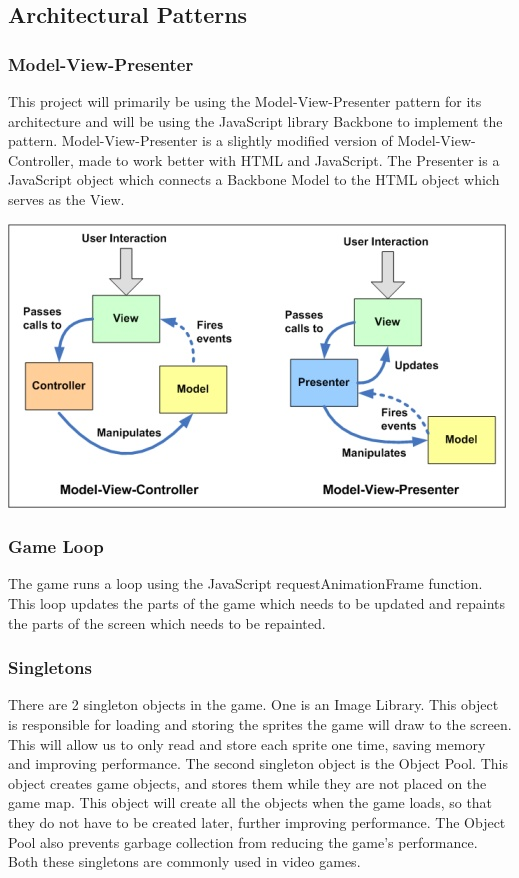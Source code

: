 \subsection{Architectural Patterns}

\subsubsection{Model-View-Presenter}
This project will primarily be using the Model-View-Presenter pattern for its architecture and will 
be using the JavaScript library Backbone to implement the pattern. Model-View-Presenter is a slightly
modified version of Model-View-Controller, made to work better with HTML and JavaScript. The Presenter
is a JavaScript object which connects a Backbone Model to the HTML object which serves as the View.

\includegraphics{pictures/mvc_mvp}

\subsubsection{Game Loop}
The game runs a loop using the JavaScript requestAnimationFrame function. This loop updates the parts 
of the game which needs to be updated and repaints the parts of the screen which needs to be repainted.

\subsubsection{Singletons}
There are 2 singleton objects in the game. One is an Image Library. This object is responsible for 
loading and storing the sprites the game will draw to the screen. This will allow us to only read and 
store each sprite one time, saving memory and improving performance. The second singleton object is 
the Object Pool. This object creates game objects, and stores them while they are not placed on the 
game map. This object will create all the objects when the game loads, so that they do not have to 
be created later, further improving performance. The Object Pool also prevents garbage collection 
from reducing the game's performance. Both these singletons are commonly used in video games.

